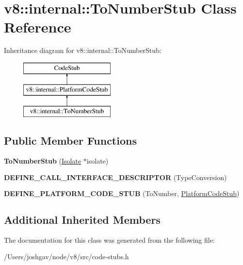 \hypertarget{classv8_1_1internal_1_1_to_number_stub}{}\section{v8\+:\+:internal\+:\+:To\+Number\+Stub Class Reference}
\label{classv8_1_1internal_1_1_to_number_stub}
Inheritance diagram for v8\+:\+:internal\+:\+:To\+Number\+Stub\+:\begin{figure}[H]
\begin{center}
\leavevmode
\includegraphics[height=3.000000cm]{classv8_1_1internal_1_1_to_number_stub}
\end{center}
\end{figure}
\subsection*{Public Member Functions}
\begin{DoxyCompactItemize}
\item 
{\bfseries To\+Number\+Stub} (\hyperlink{classv8_1_1internal_1_1_isolate}{Isolate} $\ast$isolate)\hypertarget{classv8_1_1internal_1_1_to_number_stub_a20f633e66c1ee8331c306aafc837dd13}{}\label{classv8_1_1internal_1_1_to_number_stub_a20f633e66c1ee8331c306aafc837dd13}

\item 
{\bfseries D\+E\+F\+I\+N\+E\+\_\+\+C\+A\+L\+L\+\_\+\+I\+N\+T\+E\+R\+F\+A\+C\+E\+\_\+\+D\+E\+S\+C\+R\+I\+P\+T\+OR} (Type\+Conversion)\hypertarget{classv8_1_1internal_1_1_to_number_stub_a15cb41adf3c30070f8e05a7115645fa7}{}\label{classv8_1_1internal_1_1_to_number_stub_a15cb41adf3c30070f8e05a7115645fa7}

\item 
{\bfseries D\+E\+F\+I\+N\+E\+\_\+\+P\+L\+A\+T\+F\+O\+R\+M\+\_\+\+C\+O\+D\+E\+\_\+\+S\+T\+UB} (To\+Number, \hyperlink{classv8_1_1internal_1_1_platform_code_stub}{Platform\+Code\+Stub})\hypertarget{classv8_1_1internal_1_1_to_number_stub_a708284710cab912e7673374ed526f057}{}\label{classv8_1_1internal_1_1_to_number_stub_a708284710cab912e7673374ed526f057}

\end{DoxyCompactItemize}
\subsection*{Additional Inherited Members}


The documentation for this class was generated from the following file\+:\begin{DoxyCompactItemize}
\item 
/\+Users/joshgav/node/v8/src/code-\/stubs.\+h\end{DoxyCompactItemize}
